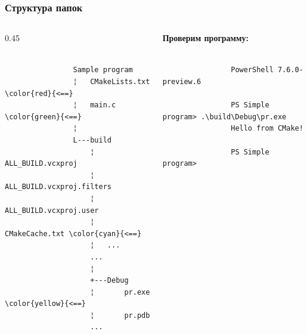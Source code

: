 \documentclass[10pt, aspectratio=1610]{beamer}
\begin{document}
\begin{frame}[fragile]\frametitle{Структура папок}

	\begin{columns}[]
		\edef\colA{0.45}
		\begin{column}{\colA\framewidth}
			\begin{Verbatim}[bgcolor=black,tabsize=4,formatcom=\color{white},gobble=4,fontsize=\small, commandchars=\\\{\}, xleftmargin=0em, frame=single,framerule=0pt ,rulecolor=\color{red},framesep=1em,fillcolor=\color{black}]
				
				Sample program
				¦   CMakeLists.txt \color{red}{<==}
				¦   main.c    \color{green}{<==}
				¦   
				L---build
					¦   ALL_BUILD.vcxproj
					¦   ALL_BUILD.vcxproj.filters
					¦   ALL_BUILD.vcxproj.user
					¦   CMakeCache.txt \color{cyan}{<==}
					¦   ...
					...   
					¦
					+---Debug
					¦       pr.exe   \color{yellow}{<==}
					¦       pr.pdb
					...
				
			\end{Verbatim}
		\end{column}
		\begin{column}{\fpeval{1-\colA}\framewidth}
			\textbf{Проверим программу:}
			
			\begin{Verbatim}[bgcolor=black,tabsize=4,formatcom=\color{white},gobble=4,fontsize=\footnotesize, xleftmargin=0em, frame=single,framerule=0pt ,rulecolor=\color{red},framesep=1em,fillcolor=\color{black}]
				
				PowerShell 7.6.0-preview.6
				
				PS Simple program> .\build\Debug\pr.exe
				Hello from CMake!
				
				PS Simple program>
				
			\end{Verbatim}
		\end{column}
	\end{columns}


	
	
\end{frame}
\end{document}
